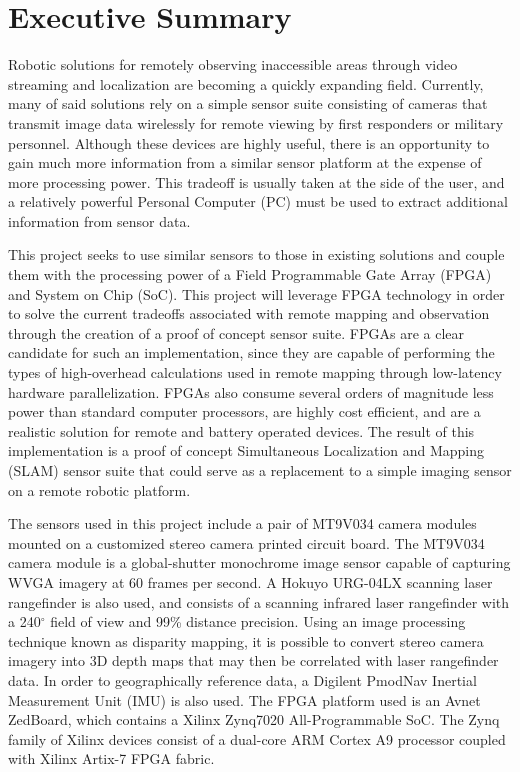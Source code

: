 {}
\section*{Executive Summary}

Robotic solutions for remotely observing inaccessible areas through video streaming and localization are becoming a quickly expanding field. Currently, many of said solutions rely on a simple sensor suite consisting of cameras that transmit image data wirelessly for remote viewing by first responders or military personnel. Although these devices are highly useful, there is an opportunity to gain much more information from a similar sensor platform at the expense of more processing power. This tradeoff is usually taken at the side of the user, and a relatively powerful Personal Computer (PC) must be used to extract additional information from sensor data. 
\par
This project seeks to use similar sensors to those in existing solutions and couple them with the processing power of a Field Programmable Gate Array (FPGA) and System on Chip (SoC). This project will leverage FPGA technology in order to solve the current tradeoffs associated with remote mapping and observation through the creation of a proof of concept sensor suite. FPGAs are a clear candidate for such an implementation, since they are capable of performing the types of high-overhead calculations used in remote mapping through low-latency hardware parallelization. FPGAs also consume several orders of magnitude less power than standard computer processors, are highly cost efficient, and are a realistic solution for remote and battery operated devices. The result of this implementation is a proof of concept Simultaneous Localization and Mapping (SLAM) sensor suite that could serve as a replacement to a simple imaging sensor on a remote robotic platform. 
\par
The sensors used in this project include a pair of MT9V034 camera modules mounted on a customized stereo camera printed circuit board. The MT9V034 camera module is a global-shutter monochrome image sensor capable of capturing WVGA imagery at 60 frames per second. A Hokuyo URG-04LX scanning laser rangefinder is also used, and consists of a scanning infrared laser rangefinder with a 240$^\circ$ field of view and 99\% distance precision. Using an image processing technique known as disparity mapping, it is possible to convert stereo camera imagery into 3D depth maps that may then be correlated with laser rangefinder data. In order to geographically reference data, a Digilent PmodNav Inertial Measurement Unit (IMU) is also used. The FPGA platform used is an Avnet ZedBoard, which contains a Xilinx Zynq7020 All-Programmable SoC. The Zynq family of Xilinx devices consist of a dual-core ARM Cortex A9 processor coupled with Xilinx Artix-7 FPGA fabric.
